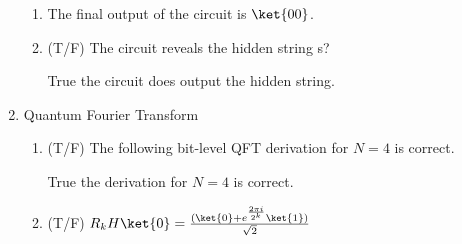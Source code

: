 \documentclass[]{article}
\begin{document}
\begin{enumerate}
\begin{enumerate}
          \item The final output of the circuit is $\ket{00}$.
          \item (T/F) The circuit reveals the hidden string s?

            True the circuit does output the hidden string.
        \end{enumerate}

      \item Quantum Fourier Transform 
        \begin{enumerate}
          \item (T/F) The following bit-level QFT derivation for $N = 4$ is correct.

            True the derivation for $N = 4$ is correct.

          \item (T/F) $R_k H \ket{0} = \frac{(\ket{0} + e^{\frac{2\pi i}{2^k}} \ket{1})}{\sqrt{2}}$


\end{enumerate}
\end{enumerate}
\end{document}
